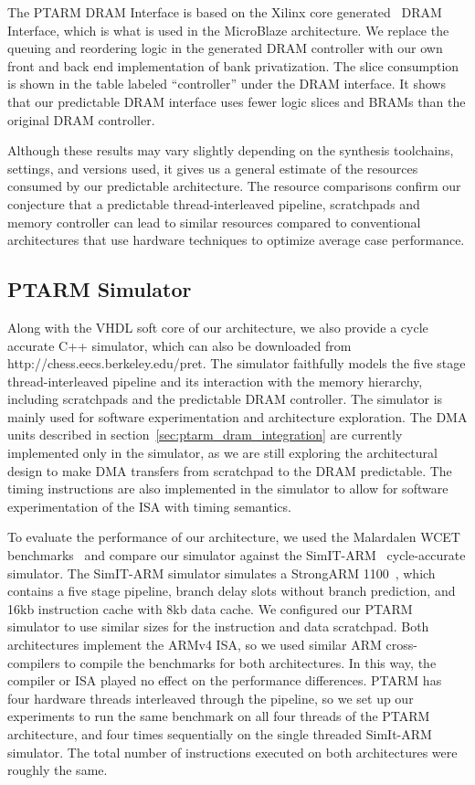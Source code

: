 The PTARM DRAM Interface is based on the Xilinx core generated~\cite{xilinx_coregen} DRAM Interface, which is what is used in the MicroBlaze architecture. 
We replace the queuing and reordering logic in the generated DRAM controller with our own front and back end implementation of bank privatization. 
The slice consumption is shown in the table labeled ``controller'' under the DRAM interface.
It shows that our predictable DRAM interface uses fewer logic slices and BRAMs than the original DRAM controller.

Although these results may vary slightly depending on the synthesis toolchains, settings, and versions used, it gives us a general estimate of the resources consumed by our predictable architecture. 
The resource comparisons confirm our conjecture that a predictable thread-interleaved pipeline, scratchpads and memory controller can lead to similar resources compared to conventional architectures that use hardware techniques to optimize average case performance. 	 
  
\subsection{PTARM Simulator}
\label{sec:ptarm_sim}
Along with the VHDL soft core of our architecture, we also provide a cycle accurate C++ simulator, which can also be downloaded from http://chess.eecs.berkeley.edu/pret. 
The simulator faithfully models the five stage thread-interleaved pipeline and its interaction with the memory hierarchy, including scratchpads and the predictable DRAM controller.
The simulator is mainly used for software experimentation and architecture exploration.    
The DMA units described in section~\ref{sec:ptarm_dram_integration} are currently implemented only in the simulator, as we are still exploring the architectural design to make DMA transfers from scratchpad to the DRAM predictable. 
The timing instructions are also implemented in the simulator to allow for software experimentation of the ISA with timing semantics.

To evaluate the performance of our architecture, we used the Malardalen WCET benchmarks~\cite{Gustafsson:WCET2010:Benchmarks} and compare our simulator against the SimIT-ARM~\cite{Qin:2003:FFM:789083.1022785} cycle-accurate simulator.
The SimIT-ARM simulator simulates a StrongARM 1100~\cite{intel-sa-1100}, which contains a five stage pipeline, branch delay slots without branch prediction, and 16kb instruction cache with 8kb data cache.
We configured our PTARM simulator to use similar sizes for the instruction and data scratchpad.
Both architectures implement the ARMv4 ISA, so we used similar ARM cross-compilers to compile the benchmarks for both architectures.
In this way, the compiler or ISA played no effect on the performance differences. 
PTARM has four hardware threads interleaved through the pipeline, so we set up our experiments to run the same benchmark on all four threads of the PTARM architecture, and four times sequentially on the single threaded SimIt-ARM simulator.
The total number of instructions executed on both architectures were roughly the same.  

